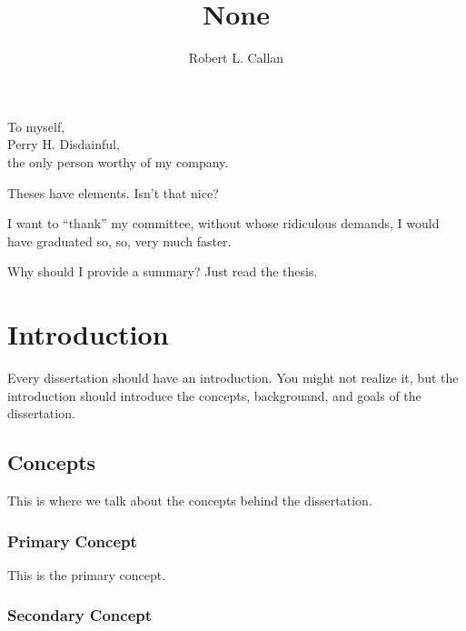 \documentclass[12pt]{gatech-thesis}
\title{None} %
\author{Robert L. Callan}
\begin{document}

\begin{preliminary}
\begin{dedication}
\null\vfil
{\large
\begin{center}
To myself,\\\vspace{12pt}
Perry H. Disdainful,\\\vspace{12pt}
the only person worthy of my company.
\end{center}}
\vfil\null
\end{dedication}
\begin{preface}
Theses have elements.  Isn't that nice?
\end{preface}
\begin{acknowledgements}
I want to ``thank'' my committee, without whose ridiculous demands, I
would have graduated so, so, very much faster.
\end{acknowledgements}
\contents
\begin{summary}
Why should I provide a summary?  Just read the thesis.
\end{summary}
\end{preliminary}
\chapter{Introduction}

Every dissertation should have an introduction.  You might not realize
it, but the introduction should introduce the concepts, backgrouand,
and goals of the dissertation.

\section{Concepts}

This is where we talk about the concepts behind the dissertation.

\subsection{Primary Concept}

This is the primary concept.

\subsection{Secondary Concept}
\end{document}
